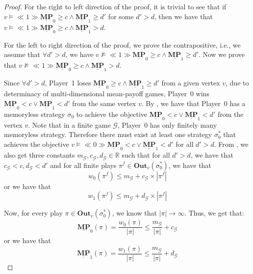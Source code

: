\begin{proof}
    For the right to left direction of the proof, it is trivial to see that 
    if $v \models \ll 1 \gg \underline{\mathbf{MP}}_0 \geqslant c \land \underline{\mathbf{MP}}_1 \geqslant d'$ for some $d' > d$, then we have that $v \models \ll 1 \gg \underline{\mathbf{MP}}_0 \geqslant c \land \underline{\mathbf{MP}}_1 > d$.

    For the left to right direction of the proof, we prove the contrapositive, i.e., we assume that $\forall d' > d$, we have $v \nvDash \ll 1 \gg \underline{\mathbf{MP}}_0 \geqslant c \land \underline{\mathbf{MP}}_1 \geqslant d'$. Now we prove that $v \nvDash \ll 1 \gg \underline{\mathbf{MP}}_0 \geqslant c \land \underline{\mathbf{MP}}_1 > d$.

    Since $\forall d'> d$, Player~1 loses $\underline{\mathbf{MP}}_0 \geqslant c \land \underline{\mathbf{MP}}_1 \geqslant d'$ from a given vertex $v$, due to determinacy of multi-dimensional mean-payoff games, Player~0 wins $\underline{\mathbf{MP}}_0 < c \lor \underline{\mathbf{MP}}_1 < d'$ from the same vertex $v$. By \textbf{}, we have that Player~0 has a memoryless strategy $\sigma_0$ to achieve the objective $\underline{\mathbf{MP}}_0 < c \lor \underline{\mathbf{MP}}_1 < d'$ from the vertex $v$. Note that in a finite game $\mathcal{G}$, Player~0 has only finitely many memoryless strategy. Therefore there must exist at least one strategy $\sigma_0^*$ that achieves the objective $v \models \ll 0 \gg \underline{\mathbf{MP}}_0 < c \lor \underline{\mathbf{MP}}_1 < d'$ for all $d' > d$. From \textbf{}, we also get three constants $m_\mathcal{G}, c_\mathcal{G}, d_\mathcal{G} \in \mathbb{R}$ such that for all $d' > d$, we have that $c_\mathcal{G} < c, d_\mathcal{G} < d'$ and for all finite plays $\pi^f \in \mathbf{Out}_v(\sigma_0^*)$, we have that
    \begin{equation*}
        w_0(\pi^f) \leqslant m_\mathcal{G} + c_\mathcal{G} \times |\pi^f|
    \end{equation*}
    or we have that
    \begin{equation*}
        w_1(\pi^f) \leqslant m_\mathcal{G} + d_\mathcal{G} \times |\pi^f|
    \end{equation*}

    Now, for every play $\pi \in \mathbf{Out}_v(\sigma_0^*)$, we know that $|\pi| \to \infty$. Thus, we get that:
    \begin{equation*}
        \underline{\mathbf{MP}}_0(\pi) = \frac{w_0(\pi)}{|\pi|} \leqslant \frac{m_\mathcal{G}}{|\pi|} + c_\mathcal{G}
    \end{equation*}
    or we have that
    \begin{equation*}
        \underline{\mathbf{MP}}_1(\pi) = \frac{w_1(\pi)}{|\pi|} \leqslant \frac{m_\mathcal{G}}{|\pi|} + d_\mathcal{G}
    \end{equation*}


\end{proof}
